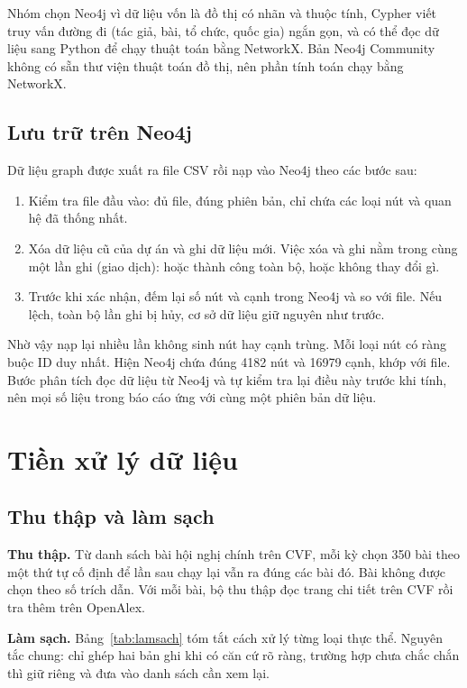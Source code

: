 \documentclass[11pt,a4paper]{article}
\begin{document}
Nhóm chọn Neo4j vì dữ liệu vốn là đồ thị có nhãn và thuộc tính, Cypher viết truy vấn đường đi (tác giả, bài, tổ chức, quốc gia) ngắn gọn, và có thể đọc dữ liệu sang Python để chạy thuật toán bằng NetworkX. Bản Neo4j Community không có sẵn thư viện thuật toán đồ thị, nên phần tính toán chạy bằng NetworkX.

\subsection{Lưu trữ trên Neo4j}\label{sec:neo4j}

Dữ liệu graph được xuất ra file CSV rồi nạp vào Neo4j theo các bước sau:
\begin{enumerate}[leftmargin=1.6em]
  \item Kiểm tra file đầu vào: đủ file, đúng phiên bản, chỉ chứa các loại nút và quan hệ đã thống nhất.
  \item Xóa dữ liệu cũ của dự án và ghi dữ liệu mới. Việc xóa và ghi nằm trong cùng một lần ghi (giao dịch): hoặc thành công toàn bộ, hoặc không thay đổi gì.
  \item Trước khi xác nhận, đếm lại số nút và cạnh trong Neo4j và so với file. Nếu lệch, toàn bộ lần ghi bị hủy, cơ sở dữ liệu giữ nguyên như trước.
\end{enumerate}

Nhờ vậy nạp lại nhiều lần không sinh nút hay cạnh trùng. Mỗi loại nút có ràng buộc ID duy nhất. Hiện Neo4j chứa đúng 4182 nút và 16979 cạnh, khớp với file. Bước phân tích đọc dữ liệu từ Neo4j và tự kiểm tra lại điều này trước khi tính, nên mọi số liệu trong báo cáo ứng với cùng một phiên bản dữ liệu.


\section{Tiền xử lý dữ liệu}

\subsection{Thu thập và làm sạch}\label{sec:tienxuly}

\textbf{Thu thập.} Từ danh sách bài hội nghị chính trên CVF, mỗi kỳ chọn 350 bài theo một thứ tự cố định để lần sau chạy lại vẫn ra đúng các bài đó. Bài không được chọn theo số trích dẫn. Với mỗi bài, bộ thu thập đọc trang chi tiết trên CVF rồi tra thêm trên OpenAlex.

\textbf{Làm sạch.} Bảng~\ref{tab:lamsach} tóm tắt cách xử lý từng loại thực thể. Nguyên tắc chung: chỉ ghép hai bản ghi khi có căn cứ rõ ràng, trường hợp chưa chắc chắn thì giữ riêng và đưa vào danh sách cần xem lại.
\end{document}
